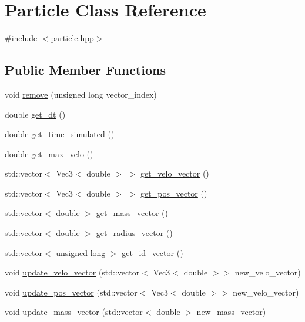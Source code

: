 \hypertarget{classParticle}{}\section{Particle Class Reference}
\label{classParticle}


{\ttfamily \#include $<$particle.\+hpp$>$}

\subsection*{Public Member Functions}
\begin{DoxyCompactItemize}
\item 
void \hyperlink{classParticle_a1b9b969dd9c1d2a8147640bde85913ca}{remove} (unsigned long vector\+\_\+index)
\item 
double \hyperlink{classParticle_a5344328ce568e08c414df7cd2af774bb}{get\+\_\+dt} ()
\item 
double \hyperlink{classParticle_adedd7d997eed2f047229245e4f19fa9e}{get\+\_\+time\+\_\+simulated} ()
\item 
double \hyperlink{classParticle_a7968aa69a99407f560a9edb8fee17eb4}{get\+\_\+max\+\_\+velo} ()
\item 
std\+::vector$<$ Vec3$<$ double $>$ $>$ \hyperlink{classParticle_a4de80e4923f09e3128dea04b4ea5a8c5}{get\+\_\+velo\+\_\+vector} ()
\item 
std\+::vector$<$ Vec3$<$ double $>$ $>$ \hyperlink{classParticle_adeed1a237686198f78c75b0e075d54b6}{get\+\_\+pos\+\_\+vector} ()
\item 
std\+::vector$<$ double $>$ \hyperlink{classParticle_a471e857745f9b262410f8e14da24b193}{get\+\_\+mass\+\_\+vector} ()
\item 
std\+::vector$<$ double $>$ \hyperlink{classParticle_aa34ecd2ae3139ba565c68e70f0002c61}{get\+\_\+radius\+\_\+vector} ()
\item 
std\+::vector$<$ unsigned long $>$ \hyperlink{classParticle_a2a245867fb618f8dada136670268ffa3}{get\+\_\+id\+\_\+vector} ()
\item 
void \hyperlink{classParticle_a9ab5c769473c26e53df88c2e645b804d}{update\+\_\+velo\+\_\+vector} (std\+::vector$<$ Vec3$<$ double $>$$>$ new\+\_\+velo\+\_\+vector)
\item 
void \hyperlink{classParticle_a2273f8e8fdbc05954a6d1e61dece5bf6}{update\+\_\+pos\+\_\+vector} (std\+::vector$<$ Vec3$<$ double $>$$>$ new\+\_\+velo\+\_\+vector)
\item 
void \hyperlink{classParticle_a49baa909e6948f888ad62084273af332}{update\+\_\+mass\+\_\+vector} (std\+::vector$<$ double $>$ new\+\_\+mass\+\_\+vector)

\end{DoxyCompactItemize}
